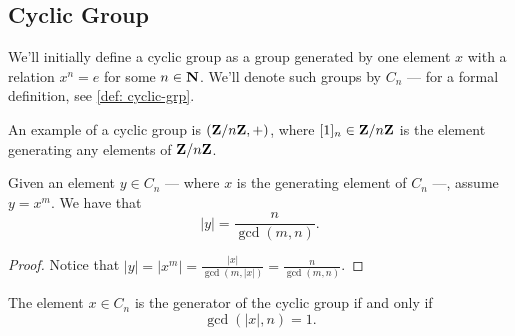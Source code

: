 \subsection{Cyclic Group}

We'll initially define a cyclic group as a group generated by one element \(x\)
with a relation \(x^n = e\) for some \(n \in \mathbf{N}\). We'll denote such groups by
\(C_n\) --- for a formal definition, see \cref{def: cyclic-grp}.

\begin{example}
  An example of a cyclic group is \((\mathbf{Z}/n\mathbf{Z}, +)\), where \([1]_n \in \mathbf{Z}/n\mathbf{Z}\) is
  the element generating any elements of \(\mathbf{Z}/n\mathbf{Z}\).
\end{example}

\begin{proposition}\label{prop: ord-cyclic-elem}
  Given an element \(y \in C_n\) --- where \(x\) is the generating element of
  \(C_n\) ---, assume \(y = x^m\). We have that
  \[
    |y| = \frac n {\operatorname{gcd}(m, n)}.
  \]
\end{proposition}

\begin{proof}
  Notice that \(|y| = |x^m| = \frac{|x|}{\operatorname{gcd}(m, |x|)} = \frac n
  {\operatorname{gcd}(m, n)}\).
\end{proof}

\begin{corollary}
  The element \(x \in C_n\) is the generator of the cyclic group if and only if
  \[
    \operatorname{gcd}(|x|, n) = 1.
  \]
\end{corollary}
